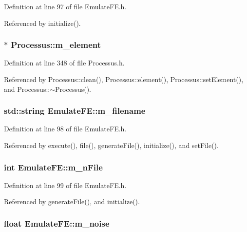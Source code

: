 Definition at line 97 of file EmulateFE.h.

Referenced by initialize().\hypertarget{classProcessus_aa9d24d53c3e52f36786cabb5d8e296e7}{
\subsubsection[{m\_\-element}]{$\ast$ {\bf Processus::m\_\-element}}}
\label{classProcessus_aa9d24d53c3e52f36786cabb5d8e296e7}


Definition at line 348 of file Processus.h.

Referenced by Processus::clean(), Processus::element(), Processus::setElement(), and Processus::$\sim$Processus().\hypertarget{classEmulateFE_a103fedea9eb5d3963573f9120cb81a68}{
\subsubsection[{m\_\-filename}]{\setlength{\rightskip}{0pt plus 5cm}std::string {\bf EmulateFE::m\_\-filename}}}
\label{classEmulateFE_a103fedea9eb5d3963573f9120cb81a68}


Definition at line 98 of file EmulateFE.h.

Referenced by execute(), file(), generateFile(), initialize(), and setFile().\hypertarget{classEmulateFE_a04ed956f5992c36590dd5a6abc19de2c}{
\subsubsection[{m\_\-nFile}]{\setlength{\rightskip}{0pt plus 5cm}int {\bf EmulateFE::m\_\-nFile}}}
\label{classEmulateFE_a04ed956f5992c36590dd5a6abc19de2c}


Definition at line 99 of file EmulateFE.h.

Referenced by generateFile(), and initialize().\hypertarget{classEmulateFE_a74f8720a1da5806fad3811339ef9b98f}{
\subsubsection[{m\_\-noise}]{\setlength{\rightskip}{0pt plus 5cm}float {\bf EmulateFE::m\_\-noise}}}
\label{classEmulateFE_a74f8720a1da5806fad3811339ef9b98f}


